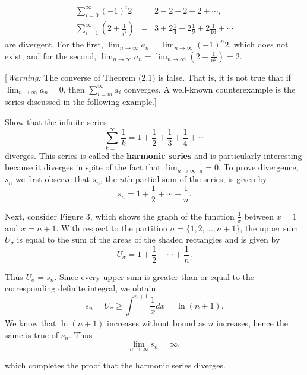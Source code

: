 \begin{eqnarray*}
                \sum_{i=0}^\infty (-1)^i 2 &=& 2 - 2 + 2 - 2 + \cdots , \\
\sum_{i=1}^\infty (2 + \frac{1}{i^2}) &=& 3 + 2\frac{1}{4} + 2\frac{1}{9} + 2\frac{1}{16} + \cdots
\end{eqnarray*}
\noindent are divergent. For the first, $\lim_{n \rightarrow \infty} a_n = \lim_{n \rightarrow \infty} (-1)^n 2$, which does not exist, and for the second, $\lim_{n \rightarrow \infty} a_n = \lim_{n \rightarrow \infty} (2 + \frac{1}{n^2}) = 2.$

[\textit{Warning:}  The converse of Theorem (2.1) is false. That is, it is not true that if $\lim_{n \rightarrow \infty} a_n = 0$, then $\sum_{i=m}^\infty a_i$ converges. A well-known counterexample is the series discussed in the following example.]

\begin{example} 
Show that the infinite series 
$$
\sum_{k=1}^\infty \frac{1}{k} = 1 + \frac{1}{2} + \frac{1}{3} + \frac{1}{4} + \cdots
$$
\noindent diverges. This series is called the \textbf{harmonic series} and is particularly interesting because it diverges in spite of the fact that $\lim_{n \rightarrow \infty} \frac{1}{n} = 0$. To prove divergence, $s_n$ we first observe that $s_n$, the $n$th partial sum of the series, is given by
$$
s_n = 1 + \frac{1}{2} + \cdots + \frac{1}{n}.
$$


\noindent Next, consider Figure 3, which shows the graph of the function $\frac{1}{x}$ between $x = 1$ and $x = n + 1$. With respect to the partition $\sigma = \{ 1, 2, . . ., n+1 \}$, the upper sum $U_\sigma$ is equal to the sum of the areas of the shaded rectangles and is given by  
$$
U_\sigma = 1 + \frac{1}{2} + \cdots + \frac{1}{n} .
$$

\noindent Thus $U_\sigma = s_n$. Since every upper sum is greater than or equal to the corresponding definite integral, we obtain
$$
s_n = U_\sigma \geq \int_1^{n+1} \frac{1}{x} dx = \ln (n + 1).
$$
\noindent We know that $\ln(n + 1)$ increases without bound as $n$ increases, hence the same is true of $s_n$. Thus
$$
\lim_{n \rightarrow \infty} s_n  = \infty,
$$

\noindent which completes the proof that the harmonic series diverges.
\end{example}

